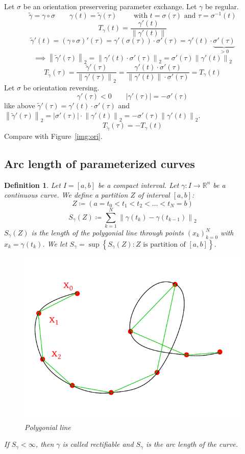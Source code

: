 \documentclass{article}
\newtheorem{definition}{Definition}  \numberwithin{definition}{section}
\newcommand{\set}[1]{\left\{#1\right\}}
\newcommand{\norm}[1]{\left\|#1\right\|}
\newcommand{\card}[1]{\left|#1\right|}
\begin{document}
Let $\sigma$ be an orientation preservering parameter exchange. Let $\gamma$ be regular.
\[
  \tilde\gamma = \gamma \circ \sigma \qquad \gamma(t) = \tilde\gamma(\tau)
  \qquad \text{ with } t = \sigma(\tau) \text{ and } \tau = \sigma^{-1}(t)
\]
\[ T_{\gamma}(t) = \frac{\gamma'(t)}{\norm{\gamma'(t)}} \]
\[ \tilde\gamma'(t) = (\gamma \circ \sigma)'(\tau) = \gamma'(\sigma(\tau)) \cdot \sigma'(\tau) = \gamma'(t) \cdot \underbrace{\sigma'(\tau)}_{> 0} \]
\[ \implies \norm{\tilde\gamma'(\tau)}_2 = \norm{\gamma'(t) \cdot \sigma'(\tau)}_2 = \sigma'(\tau) \norm{\gamma'(t)}_2 \]
\[ T_{\tilde\gamma}(\tau) = \frac{\tilde\gamma'(\tau)}{\norm{\gamma'(\tau)}_2} = \frac{\gamma'(t) \cdot \sigma'(\tau)}{\norm{\gamma'(t)} \cdot \sigma'(\tau)} = T_{\gamma}(t) \]
Let $\sigma$ be orientation reversing.
\[ \gamma'(\tau) < 0 \qquad \card{\gamma'(\tau)} = -\sigma'(\tau) \]
like above $\tilde\gamma'(\tau) = \gamma'(t) \cdot \sigma'(\tau)$ and $\norm{\tilde\gamma'(\tau)}_2 = \card{\sigma'(\tau)} \cdot \norm{\gamma'(t)}_2 = -\sigma'(\tau) \norm{\gamma'(t)}_2$.
\[ T_{\tilde\gamma}(\tau) = -T_{\gamma}(t) \]
Compare with Figure~\ref{img:ori}.

\subsection{Arc length of parameterized curves}
\begin{definition} %
  Let $I = [a,b]$ be a compact interval. Let $\gamma: I \to \mathbb R^n$ be a continuous curve.
  We define a partition $Z$ of interval $[a,b]$:
  \[ Z \coloneqq (a = t_0 < t_1 < t_2 < \dots < t_N = b) \]
  \[ S_\gamma(Z) \coloneqq \sum_{k=1}^N \norm{\gamma(t_k) - \gamma(t_{k-1})}_2 \]
  $S_\gamma(Z)$ is the length of the polygonial line through points $(x_k)_{k=0}^N$ with $x_k = \gamma(t_k)$.
  We let $S_\gamma = \sup\set{S_\gamma(Z): Z \text{ is partition of } [a,b]}$.

  \begin{figure}[t]
    \begin{center}
      \includegraphics[width=.6\textwidth]{img/46_polygonial_line.pdf}
      \caption{Polygonial line}
      \label{fig:polygonial-line}
    \end{center}
  \end{figure}

  If $S_{\gamma} < \infty$, then $\gamma$ is called \emph{rectifiable}
  and $S_{\gamma}$ is the \emph{arc length of the curve}.
\end{definition}
\end{document}
